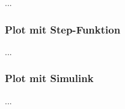 %
                    
...
\subsubsection{Plot mit Step-Funktion}
...
\subsubsection{Plot mit Simulink}
...